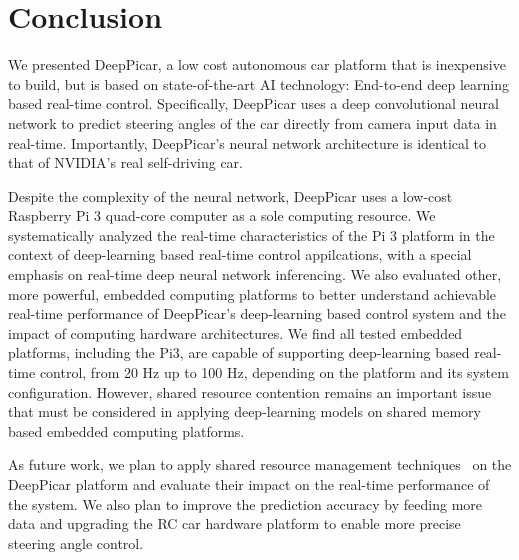\section{Conclusion}\label{sec:conclusion}
We presented DeepPicar, a low cost autonomous car platform that is
inexpensive to build, but is based on state-of-the-art AI technology:
End-to-end deep learning based real-time control.
Specifically, DeepPicar uses a deep convolutional neural network to
predict steering angles of the car directly from camera input data
in real-time. Importantly, DeepPicar's neural network architecture is
identical to that of NVIDIA's real self-driving car. 

Despite the complexity of the neural network, DeepPicar uses a
low-cost Raspberry Pi 3 quad-core computer as a sole computing
resource. We systematically analyzed the real-time characteristics of
the Pi 3 platform in the context of deep-learning based real-time
control appilcations, with a special emphasis on real-time deep neural
network inferencing.
We also evaluated other, more powerful, embedded computing
platforms to better understand achievable real-time performance of
DeepPicar's deep-learning based control system and the impact of
computing hardware architectures.
We find all tested embedded platforms, including the Pi3, are capable
of supporting deep-learning based real-time control, from 20 Hz up to
100 Hz, depending on the platform and its system
configuration. However, shared resource contention remains an
important issue that must be considered in applying deep-learning
models on shared memory based embedded computing platforms.


As future work, we plan to apply shared resource management
techniques~\cite{Yun2013,yun2014rtas} on the DeepPicar platform and
evaluate their impact on the real-time performance of the system. We
also plan to improve the prediction accuracy by feeding more data and
upgrading the RC car hardware platform to enable more precise steering
angle control.

